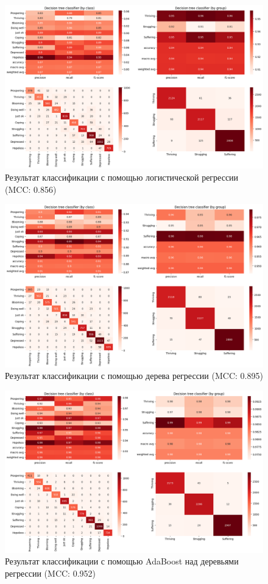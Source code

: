\begin{figure}
	\begin{center}
		\includegraphics[width=\textwidth]{images/3.png}
	\end{center}
	\caption{Результат классификации с помощью логистической регрессии (MCC: 0.856)}
	\label{img:3}
\end{figure}

\begin{figure}
	\begin{center}
		\includegraphics[width=\textwidth]{images/4.png}
	\end{center}
	\caption{Результат классификации с помощью дерева регрессии (MCC: 0.895)}
	\label{img:4}
\end{figure}

\begin{figure}
	\begin{center}
		\includegraphics[width=\textwidth]{images/5.png}
	\end{center}
	\caption{Результат классификации с помощью AdaBoost над деревьями регрессии (MCC: 0.952)}
	\label{img:5}
\end{figure}

\clearpage
